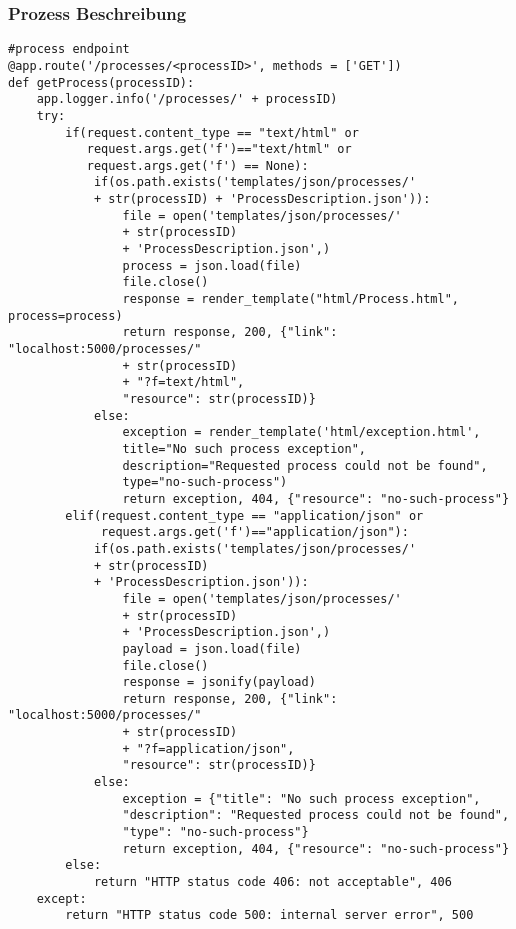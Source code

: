 \subsubsection{Prozess Beschreibung}
\begin{lstlisting}[caption={Process Description Endpoint}, style = Python]
#process endpoint
@app.route('/processes/<processID>', methods = ['GET']) 
def getProcess(processID):
    app.logger.info('/processes/' + processID) 
    try:
        if(request.content_type == "text/html" or 
           request.args.get('f')=="text/html" or 
           request.args.get('f') == None): 
            if(os.path.exists('templates/json/processes/' 
            + str(processID) + 'ProcessDescription.json')): 
                file = open('templates/json/processes/' 
                + str(processID) 
                + 'ProcessDescription.json',) 
                process = json.load(file) 
                file.close() 
                response = render_template("html/Process.html", process=process) 
                return response, 200, {"link": "localhost:5000/processes/" 
                + str(processID) 
                + "?f=text/html", 
                "resource": str(processID)} 
            else:
                exception = render_template('html/exception.html', 
                title="No such process exception", 
                description="Requested process could not be found", 
                type="no-such-process")
                return exception, 404, {"resource": "no-such-process"}
        elif(request.content_type == "application/json" or
             request.args.get('f')=="application/json"): 
            if(os.path.exists('templates/json/processes/' 
            + str(processID) 
            + 'ProcessDescription.json')): 
                file = open('templates/json/processes/' 
                + str(processID) 
                + 'ProcessDescription.json',)
                payload = json.load(file) 
                file.close() 
                response = jsonify(payload) 
                return response, 200, {"link": "localhost:5000/processes/" 
                + str(processID) 
                + "?f=application/json", 
                "resource": str(processID)} 
            else:
                exception = {"title": "No such process exception", 
                "description": "Requested process could not be found", 
                "type": "no-such-process"}
                return exception, 404, {"resource": "no-such-process"} 
        else:
            return "HTTP status code 406: not acceptable", 406
    except:
        return "HTTP status code 500: internal server error", 500 
    \end{lstlisting}   
